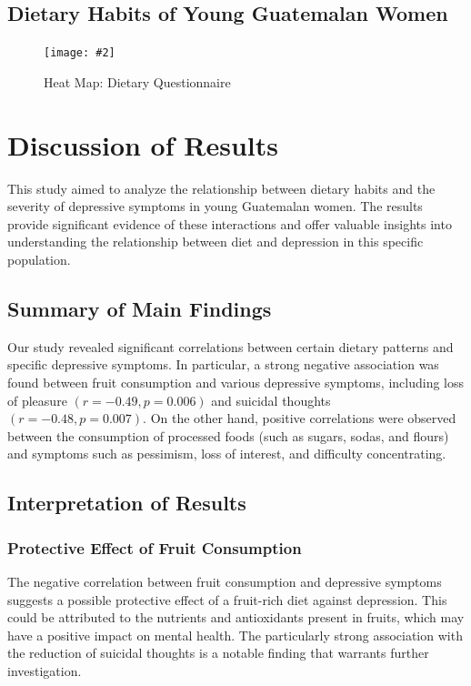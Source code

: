 \documentclass[jou]{apa7}
\newcommand{\includegraphicsmax}[2][]{%
	\texttt{[image: \#2]}%
}
\begin{document}
\subsection{Dietary Habits of Young Guatemalan Women}
\begin{figure}[!ht]
	\centering
	\includegraphicsmax{dietGraph.pdf}
	\caption{Heat Map: Dietary Questionnaire}
	\label{fig:Figure3}
\end{figure}

\section{Discussion of Results}\label{discusiuxf3n-de-resultados}

This study aimed to analyze the relationship between dietary habits and the severity of depressive symptoms in young Guatemalan women. The results provide significant evidence of these interactions and offer valuable insights into understanding the relationship between diet and depression in this specific population.

\subsection{Summary of Main Findings}\label{resumen-de-hallazgos-principales}

Our study revealed significant correlations between certain dietary patterns and specific depressive symptoms. In particular, a strong negative association was found between fruit consumption and various depressive symptoms, including loss of pleasure $(r = -0.49, p = 0.006)$ and suicidal thoughts $(r = -0.48, p = 0.007)$. On the other hand, positive correlations were observed between the consumption of processed foods (such as sugars, sodas, and flours) and symptoms such as pessimism, loss of interest, and difficulty concentrating.

\subsection{Interpretation of Results}\label{interpretaciuxf3n-de-resultados}

\subsubsection{Protective Effect of Fruit Consumption}

The negative correlation between fruit consumption and depressive symptoms suggests a possible protective effect of a fruit-rich diet against depression. This could be attributed to the nutrients and antioxidants present in fruits, which may have a positive impact on mental health. The particularly strong association with the reduction of suicidal thoughts is a notable finding that warrants further investigation.
\end{document}
